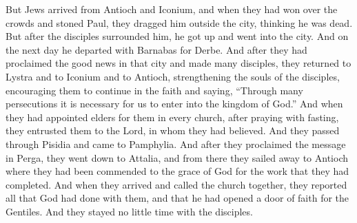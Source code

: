 \begin{biblechapter}
\verse But Jews arrived from Antioch and Iconium, and when they had won over the crowds and stoned Paul, they dragged him outside the city, thinking he was dead.
\verse But after the disciples surrounded him, he got up and went into the city. And on the next day he departed with Barnabas for Derbe.
 And after they had proclaimed the good news in that city and made many disciples, they returned to Lystra and to Iconium and to Antioch,
\verse strengthening the souls of the disciples, encouraging them to continue in the faith and saying, “Through many persecutions it is necessary for us to enter into the kingdom of God.”
\verse And when they had appointed elders for them in every church, after praying with fasting, they entrusted them to the Lord, in whom they had believed.
\verse And they passed through Pisidia and came to Pamphylia.
\verse And after they proclaimed the message in Perga, they went down to Attalia,
\verse and from there they sailed away to Antioch where they had been commended to the grace of God for the work that they had completed.
\verse And when they arrived and called the church together, they reported all that God had done with them, and that he had opened a door of faith for the Gentiles.
\verse And they stayed no little time with the disciples.
\end{biblechapter}

